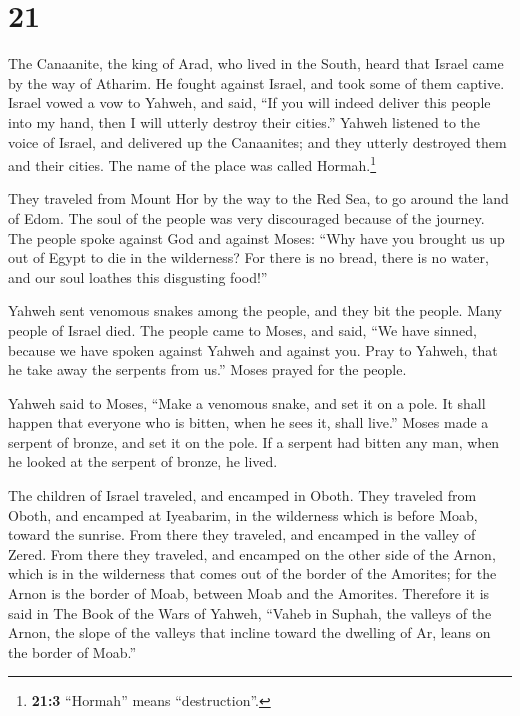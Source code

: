 \hypertarget{section-20}{%
\section{21}\label{section-20}}

 The Canaanite, the king of Arad, who lived in the South,
heard that Israel came by the way of Atharim. He fought against Israel,
and took some of them captive.  Israel vowed a vow to
Yahweh, and said, ``If you will indeed deliver this people into my hand,
then I will utterly destroy their cities.''  Yahweh
listened to the voice of Israel, and delivered up the Canaanites; and
they utterly destroyed them and their cities. The name of the place was
called Hormah.\footnote{\textbf{21:3} ``Hormah'' means ``destruction''.}

 They traveled from Mount Hor by the way to the Red Sea,
to go around the land of Edom. The soul of the people was very
discouraged because of the journey.  The people spoke
against God and against Moses: ``Why have you brought us up out of Egypt
to die in the wilderness? For there is no bread, there is no water, and
our soul loathes this disgusting food!''

 Yahweh sent venomous snakes among the people, and they
bit the people. Many people of Israel died.  The people
came to Moses, and said, ``We have sinned, because we have spoken
against Yahweh and against you. Pray to Yahweh, that he take away the
serpents from us.'' Moses prayed for the people.

 Yahweh said to Moses, ``Make a venomous snake, and set it
on a pole. It shall happen that everyone who is bitten, when he sees it,
shall live.''  Moses made a serpent of bronze, and set it
on the pole. If a serpent had bitten any man, when he looked at the
serpent of bronze, he lived.

 The children of Israel traveled, and encamped in Oboth.
 They traveled from Oboth, and encamped at Iyeabarim, in
the wilderness which is before Moab, toward the sunrise. 
From there they traveled, and encamped in the valley of Zered.
 From there they traveled, and encamped on the other side
of the Arnon, which is in the wilderness that comes out of the border of
the Amorites; for the Arnon is the border of Moab, between Moab and the
Amorites.  Therefore it is said in The Book of the Wars
of Yahweh, ``Vaheb in Suphah, the valleys of the Arnon, 
the slope of the valleys that incline toward the dwelling of Ar, leans
on the border of Moab.''

